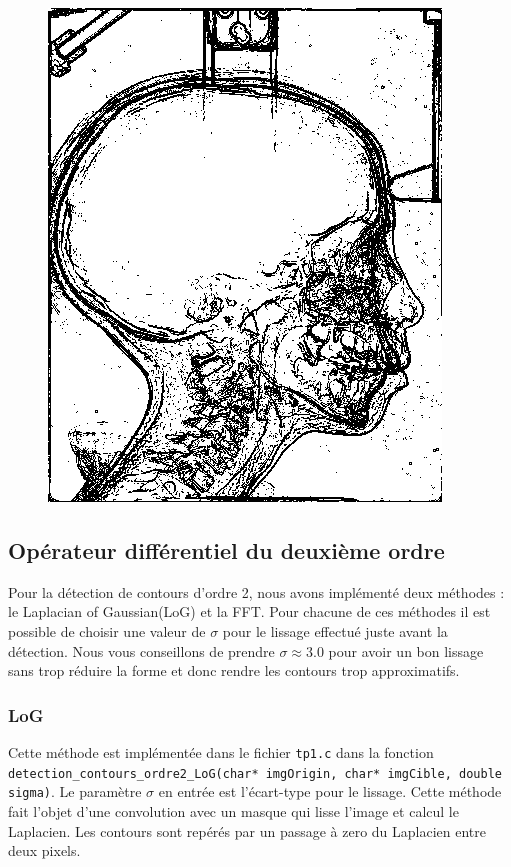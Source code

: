 \documentclass[paper=a4, fontsize=11pt]{scrartcl} %
\begin{document}
\begin{figure} [h!]
\includegraphics[scale=0.5]{images/rapport/coucou1.png} 
\end{figure}

\newpage

\subsection{Opérateur différentiel du deuxième ordre}

Pour la détection de contours d'ordre 2, nous avons implémenté deux méthodes : le Laplacian of Gaussian(LoG) et la FFT. Pour chacune de ces méthodes il est possible de choisir une valeur de $\sigma$ pour le lissage effectué juste avant la détection. Nous vous conseillons de prendre $\sigma \approx 3.0$ pour avoir un bon lissage sans trop réduire la forme et donc rendre les contours trop approximatifs.

\subsubsection{LoG}
Cette méthode est implémentée dans le fichier \texttt{tp1.c} dans la fonction \\
 \texttt{detection\_contours\_ordre2\_LoG(char* imgOrigin, char* imgCible, double sigma)}. Le paramètre $\sigma$ en entrée est l'écart-type pour le lissage.
Cette méthode fait l'objet d'une convolution avec un masque qui lisse l'image et calcul le Laplacien. Les contours sont repérés par un passage à zero du Laplacien entre deux pixels.
\end{document}
